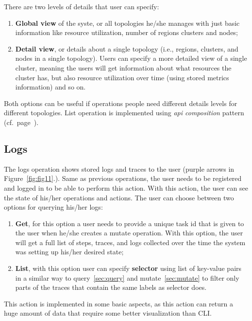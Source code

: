 There are two levels of details that user can specify:

\begin{enumerate}[start=1,label={(\bfseries \arabic*)}]
	\item \textbf{Global view}  of the syste, or all topologies he/she manages with just basic information like resource utilization, number of regions clusters and nodes;
	\item \textbf{Detail view}, or details about a single topology (i.e., regions, clusters, and nodes in a single topology). Users can specify a more detailed view of a single cluster, meaning the users will get information about what resources the cluster has, but also resource utilization over time (using stored metrics information) and so on.
\end{enumerate}

\noindent
Both options can be useful if operations people need different details levels for different topologies. List operation is implemented using \emph{api composition} pattern (cf.~page~\pageref{par:composition}).
%
%
\subsection{Logs}\label{sec:logs}
% 
The logs operation shows stored logs and traces to the user (purple arrows in Figure~\ref{fig:fig11}.). Same as previous operations, the user needs to be registered and logged in to be able to perform this action. With this action, the user can see the state of his/her operations and actions. The user can choose between two options for querying his/her logs:

\begin{enumerate}[start=1,label={(\bfseries \arabic*)}]
	\item \textbf{Get}, for this option a user needs to provide a unique task id that is given to the user when he/she creates a mutate operation. With this option, the user will get a full list of steps, traces, and logs collected over the time the system was setting up his/her desired state; 
	\item \textbf{List}, with this option user can specify \textbf{selector} using list of key-value pairs in a similar way to query~\ref{sec:query} and mutate~\ref{sec:mutate} to filter only parts of the traces that contain the same labels as selector does.
\end{enumerate}

\noindent
This action is implemented in some basic aspects, as this action can return a huge amount of data that require some better visualization than CLI.
%
%
